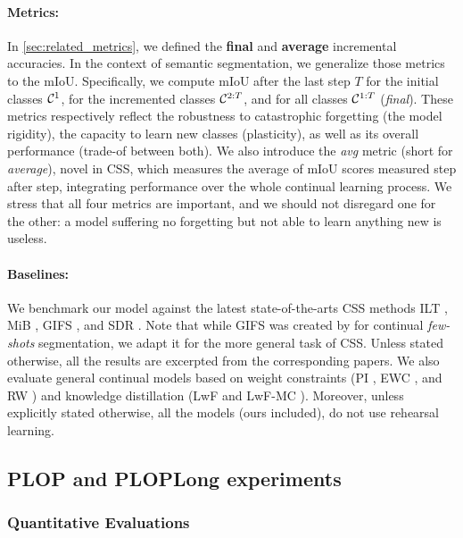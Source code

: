 \paragraph{Metrics:} In \autoref{sec:related_metrics}, we defined the \textbf{final} and
\textbf{average} incremental accuracies. In the context of semantic segmentation, we generalize
those metrics to the \acf{mIoU}. Specifically, we compute \ac{mIoU} after the last step $T$ for the
initial classes $\mathcal{C}^{1}$, for the incremented classes $\mathcal{C}^{2:T}$, and for all classes
$\mathcal{C}^{1:T}$ (\textit{final}). These metrics respectively reflect the robustness to catastrophic
forgetting (the model rigidity), the capacity to learn new classes (plasticity), as well as its
overall performance (trade-of between both). We also introduce the \textit{avg} metric (short for
\textit{average}), novel in \ac{CSS}, which measures the average of \ac{mIoU} scores measured step
after step, integrating performance over the whole continual learning process. We stress that all
four metrics are important, and we should not disregard one for the other: a model suffering no
forgetting but not able to learn anything new is useless.

\paragraph{Baselines:} We benchmark our model against the latest state-of-the-arts \ac{CSS} methods
ILT \citep{michieli2019ilt}, MiB \citep{cermelli2020modelingthebackground}, GIFS
\citep{cermelli2020fewshotcontinualsegm}, and SDR \citep{michieli2021sdr}. Note that while GIFS was
created by \citet{cermelli2020fewshotcontinualsegm} for continual \textit{few-shots} segmentation, we
adapt it for the more general task of \ac{CSS}. Unless stated otherwise, all the results are
excerpted from the corresponding papers. We also evaluate general continual models based on weight
constraints (PI \citep{zenke2017synaptic_intelligence}, EWC \citep{kirkpatrick2017ewc}, and RW
\citep{chaudhry2018riemannien_walk}) and knowledge distillation (LwF \citep{li2018lwf} and LwF-MC
\citep{rebuffi2017icarl}). Moreover, unless explicitly stated otherwise, all the models (ours
included), do not use rehearsal learning.

\subsection{PLOP and PLOPLong experiments}
\label{sec:seg_plop_exp}

\subsubsection{Quantitative Evaluations}

